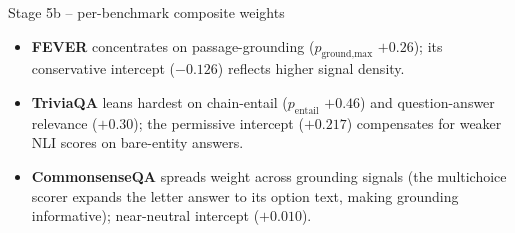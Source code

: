 \documentclass[10pt,aspectratio=169]{beamer}
\begin{document}
\begin{frame}{Stage 5b -- per-benchmark composite weights}
  \vspace{0.4em}
  \begin{itemize}\scriptsize
    \item \textbf{FEVER} concentrates on passage-grounding ($p_{\text{ground,max}}$ $+0.26$); its conservative intercept ($-0.126$) reflects higher signal density.
    \item \textbf{TriviaQA} leans hardest on chain-entail ($p_{\text{entail}}$ $+0.46$) and question-answer relevance ($+0.30$); the permissive intercept ($+0.217$) compensates for weaker NLI scores on bare-entity answers.
    \item \textbf{CommonsenseQA} spreads weight across grounding signals (the multichoice scorer expands the letter answer to its option text, making grounding informative); near-neutral intercept ($+0.010$).
  \end{itemize}
\end{frame}
\end{document}
